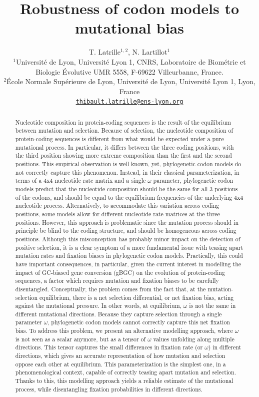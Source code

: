 \documentclass{article}
\title{Robustness of codon models to mutational bias}
\author{
 \large
 T. {Latrille}$^{1,2}$, N. {Lartillot}$^{1}$ \\
 \normalsize
	$^{1}$Université de Lyon, Université Lyon 1, CNRS, Laboratoire de Biométrie et Biologie Évolutive UMR 5558, F-69622 Villeurbanne, France.\\
	$^{2}$École Normale Supérieure de Lyon, Université de Lyon, Université Lyon 1, Lyon, France\\
	\texttt{\href{mailto:thibault.latrille@ens-lyon.org}{thibault.latrille@ens-lyon.org}} \\
}
\begin{document}
\maketitle

\begin{abstract}
 Nucleotide composition in protein-coding sequences is the result of the equilibrium between mutation and selection.
 Because of selection, the nucleotide composition of protein-coding sequences is different from what would be expected under a pure mutational process.
 In particular, it differs between the three coding positions, with the third position showing more extreme composition than the first and the second positions.
 This empirical observation is well known, yet, phylogenetic codon models do not correctly capture this phenomenon.
 Instead, in their classical parameterization, in terms of a 4x4 nucleotide rate matrix and a single $\omega$ parameter, phylogenetic codon models predict that the nucleotide composition should be the same for all $3$ positions of the codons, and should be equal to the equilibrium frequencies of the underlying 4x4 nucleotide process.
 Alternatively, to accommodate this variation across coding positions, some models allow for different nucleotide rate matrices at the three positions.
 However, this approach is problematic since the mutation process should in principle be blind to the coding structure, and should be homogeneous across coding positions.
 Although this misconception has probably minor impact on the detection of positive selection, it is a clear symptom of a more fundamental issue with teasing apart mutation rates and fixation biases in phylogenetic codon models.
 Practically, this could have important consequences, in particular, given the current interest in modelling the impact of GC-biased gene conversion ({gBGC}) on the evolution of protein-coding sequences, a factor which requires mutation and fixation biases to be carefully disentangled.
 Conceptually, the problem comes from the fact that, at the mutation-selection equilibrium, there is a net selection differential, or net fixation bias, acting against the mutational pressure.
 In other words, at equilibrium, $\omega$ is not the same in different mutational directions.
 Because they capture selection through a single parameter $\omega$, phylogenetic codon models cannot correctly capture this net fixation bias.
 To address this problem, we present an alternative modelling approach, where $\omega$ is not seen as a scalar anymore, but as a tensor of $\omega$ values unfolding along multiple directions.
 This tensor captures the small differences in fixation rate (or $\omega$) in different directions, which gives an accurate representation of how mutation and selection oppose each other at equilibrium.
 This parameterization is the simplest one, in a phenomenological context, capable of correctly teasing apart mutation and selection.
 Thanks to this, this modelling approach yields a reliable estimate of the mutational process, while disentangling fixation probabilities in different directions.
\end{abstract}
\end{document}
